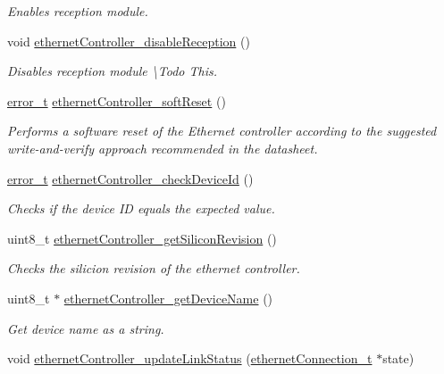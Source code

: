 \begin{DoxyCompactItemize}
\begin{DoxyCompactList}\small\item\em Enables reception module. \end{DoxyCompactList}\item 
void \mbox{\hyperlink{group__init_ga9cb4657907d3985ecf5b867f7a8a9304}{ethernet\+Controller\+\_\+disable\+Reception}} ()
\begin{DoxyCompactList}\small\item\em Disables reception module \textbackslash{}\+Todo This. \end{DoxyCompactList}\item 
\mbox{\hyperlink{group__error_gad3ae44be85fe6952dcaed425499e8f6b}{error\+\_\+t}} \mbox{\hyperlink{group__init_ga6a772ec407e60e921bad4db7a2be2676}{ethernet\+Controller\+\_\+soft\+Reset}} ()
\begin{DoxyCompactList}\small\item\em Performs a software reset of the Ethernet controller according to the suggested write-\/and-\/verify approach recommended in the datasheet. \end{DoxyCompactList}\item 
\mbox{\hyperlink{group__error_gad3ae44be85fe6952dcaed425499e8f6b}{error\+\_\+t}} \mbox{\hyperlink{group__init_ga67521cdab8bfce49cee40d037a888793}{ethernet\+Controller\+\_\+check\+Device\+Id}} ()
\begin{DoxyCompactList}\small\item\em Checks if the device ID equals the expected value. \end{DoxyCompactList}\item 
uint8\+\_\+t \mbox{\hyperlink{group__init_gaa3396c9822f00c6519a0e7a421048a71}{ethernet\+Controller\+\_\+get\+Silicon\+Revision}} ()
\begin{DoxyCompactList}\small\item\em Checks the silicion revision of the ethernet controller. \end{DoxyCompactList}\item 
uint8\+\_\+t $\ast$ \mbox{\hyperlink{group__init_gae396f51c0fdba634e4e84b5f2b5d9416}{ethernet\+Controller\+\_\+get\+Device\+Name}} ()
\begin{DoxyCompactList}\small\item\em Get device name as a string. \end{DoxyCompactList}\item 
void \mbox{\hyperlink{group__init_gab294a8fbc5b11d40a5da5e769110f6ca}{ethernet\+Controller\+\_\+update\+Link\+Status}} (\mbox{\hyperlink{group__ethernet_gae7b6008a02816680c2e3a1e3d2451a60}{ethernet\+Connection\+\_\+t}} $\ast$state)

\end{DoxyCompactItemize}
